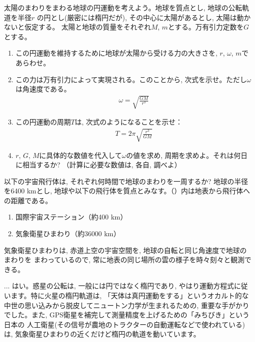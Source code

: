 \begin{q}\label{q:sun_earth0}
太陽のまわりをまわる地球の円運動を考えよう。地球を質点とし, 地球の公転軌道を半径$r$
の円とし(厳密には楕円だが), その中心に太陽があるとし, 太陽は動かないと仮定する。
太陽と地球の質量をそれぞれ$M$, $m$とする。万有引力定数を$G$とする。
\begin{enumerate}
\item この円運動を維持するために地球が太陽から受ける力の大きさを, $r$, $\omega$, $m$であらわせ。
\item この力は万有引力によって実現される。このことから, 次式を示せ。ただし$\omega$は角速度である。
\begin{eqnarray}\omega=\sqrt{\frac{GM}{r^3}}\label{eq:circle_grav_omega}\end{eqnarray}
\item この円運動の周期$T$は, 次式のようになることを示せ：
\begin{eqnarray}T=2\pi\sqrt{\frac{r^3}{GM}}\label{eq:circle_grav_T}\end{eqnarray}
\item $r$, $G$, $M$に具体的な数値を代入して$\omega$の値を求め, 周期を求めよ。それは何日に相当するか? 
（計算に必要な数値は, 各自, 調べよ）
\end{enumerate}
\end{q}
\vspace{0.2cm}

\begin{q}\label{q:spaceship}
以下の宇宙飛行体は, それぞれ何時間で地球のまわりを一周するか? 地球の半径を6400 kmとし, 
地球や以下の飛行体を質点とみなす。（）内は地表から飛行体への距離である。
\begin{enumerate}
\item 国際宇宙ステーション（約400 km）
\item 気象衛星ひまわり（約36000 km）
\end{enumerate}
\end{q}

気象衛星ひまわりは, 赤道上空の宇宙空間を, 地球の自転と同じ角速度で地球のまわりを
まわっているので, 常に地表の同じ場所の雲の様子を時々刻々と観測できる。
\mv

\begin{faq}{\small{} ... 
はい。惑星の公転は, 一般には円ではなく楕円であり, やはり運動方程式に従います。特に火星の楕円軌道は, 
「天体は真円運動をする」というオカルト的な中世の思い込みから脱皮してニュートン力学が生まれるための, 
重要な手がかりでした。また, GPS衛星を補完して測量精度を上げるための「みちびき」という日本の
人工衛星(その信号が農地のトラクターの自動運転などで使われている)は, 
気象衛星ひまわりの近くだけど楕円の軌道を動いています。}\end{faq}\mv

